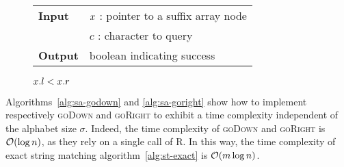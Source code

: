 \begin{figure*}[b]
\begin{center}
\begin{minipage}[t]{.6\textwidth}
\begin{algorithm}[H]
\begin{tabular}{ll}
\textbf{Input}  & $x$ : pointer to a suffix array node\\
				& $c$ : character to query\\
\textbf{Output} & boolean indicating success\\
\end{tabular}
\begin{algorithmic}[1]
	\State \Return \False
\EndIf
{}
\State \Return $x.l < x.r$
\end{algorithmic}
\label{alg:sa-godownc}
\end{algorithm}
\end{minipage}
\end{center}
\end{figure*}

Algorithms~\ref{alg:sa-godown} and \ref{alg:sa-goright} show how to implement respectively \textsc{goDown} and \textsc{goRight} to exhibit a time complexity independent of the alphabet size $\sigma$.
Indeed, the time complexity of \textsc{goDown} and \textsc{goRight} is $\mathcal{O}(\log{n})$, as they rely on a single call of \textsc{R}.
In this way, the time complexity of exact string matching algorithm~\ref{alg:st-exact} is $\mathcal{O}(m \log{n})$.

